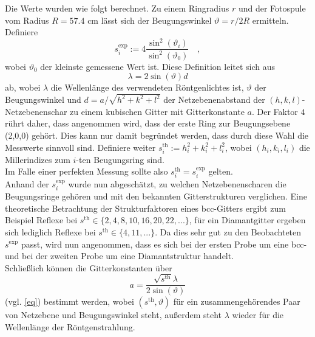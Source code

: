 Die Werte wurden wie folgt berechnet. Zu einem Ringradius $r$ und der Fotospule vom
Radius $R=57.4 \text{ cm}$ lässt sich der Beugungswinkel $\vartheta=r/2R$ ermitteln.
Definiere
\begin{equation}
s_i^\text{exp}:=4 \frac{\sin^2(\vartheta_i)}{\sin^2(\vartheta_0)} \quad ,
\end{equation}
wobei $\vartheta_0$ der kleinste gemessene Wert ist. Diese Definition leitet sich
aus
\begin{equation}
\lambda=2\sin(\vartheta) d \label{eq}
\end{equation}
ab, wobei $\lambda$ die Wellenlänge des verwendeten Röntgenlichtes ist, $\vartheta$ der Beugungswinkel und $d=a/\sqrt{h^2+k^2+l^2}$ der Netzebenenabstand der $(h,k,l)$-
Netzebenenschar zu einem kubischen Gitter mit Gitterkonstante $a$. Der Faktor $4$ rührt daher, dass angenommen wird, dass der erste Ring zur
Beugungsebene (2,0,0) gehört. Dies kann nur damit begründet werden, dass durch diese
Wahl die Messwerte sinnvoll sind.
Definiere weiter $s^\text{th}_i:=h_i^2+k_i^2+l_i^2$, wobei $(h_i,k_i,l_i)$ die
Millerindizes zum $i$-ten Beugungsring sind.\\
Im Falle einer perfekten Messung sollte also $s_i^\text{th}=s_i^\text{exp}$ gelten.
\\
Anhand der $s_i^\text{exp}$ wurde nun abgeschätzt, zu welchen Netzebenenscharen die
Beugungsringe gehören und mit den bekannten Gitterstrukturen verglichen. Eine
theoretische Betrachtung der Strukturfaktoren eines bcc-Gitters ergibt zum Beispiel
Reflexe bei $s^\text{th} \in \{ 2,4,8,10,16,20,22,... \}$, für ein Diamantgitter
ergeben sich lediglich Reflexe bei $s^\text{th}\in \{ 4,11,... \}$. Da dies sehr gut
zu den Beobachteten $s^\text{exp}$ passt, wird nun angenommen, dass es sich bei der
ersten Probe um eine bcc- und bei der zweiten Probe um eine Diamantstruktur handelt.
\\
Schließlich können die Gitterkonstanten über
\begin{equation}
a=\frac{\sqrt{s^\text{th}} \lambda}{2 \sin(\vartheta)}
\end{equation}
(vgl. \eqref{eq}) bestimmt werden, wobei $(s^\text{th},\vartheta)$ für ein
zusammengehörendes Paar von Netzebene und Beugungswinkel steht, außerdem steht
$\lambda$ wieder für die Wellenlänge der Röntgenstrahlung.

